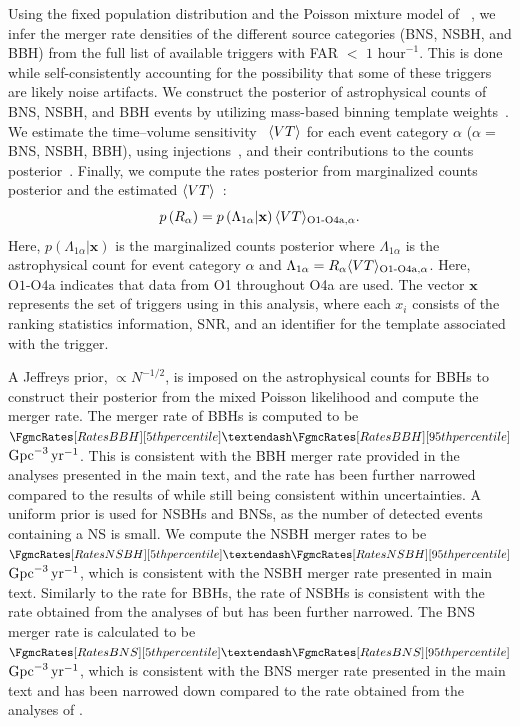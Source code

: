 Using the fixed population distribution and the Poisson mixture model of 
~\cite{Kapadia:2019uut}, we  infer the merger rate densities of the different 
source categories (\ac{BNS}, \ac{NSBH}, and \ac{BBH}) from the full list of 
available \GSTLAL triggers with \ac{FAR} $<$ $1$ $\text{hour}^{-1}$.
This is done while self-consistently accounting for the 
possibility that some of these triggers are likely noise artifacts. 
We construct the posterior of astrophysical counts of \ac{BNS}, \ac{NSBH}, 
and \ac{BBH} events by utilizing mass-based binning template weights~\citep{Ray:2023nhx}.
We estimate the time--volume sensitivity~\citep{Tiwari:2017ndi, GWTC:Methods} 
$\langle VT \rangle$ for each event category $\alpha$ 
($\alpha = $ \ac{BNS}, \ac{NSBH}, \ac{BBH}), using injections~\citep{Essick:2025zed}, 
and their contributions to the counts posterior~\citep{Kapadia:2019uut}. 
Finally, we compute the rates posterior from marginalized counts posterior and 
the estimated $\langle VT \rangle$~\citep{LIGOScientific:2018mvr, LIGOScientific:2020kqk, KAGRA:2021duu, GWTC:Results}:
\begin{equation}
	p\left(R_\alpha\right) = p\left(\Lambda_{1 \alpha} | \mathbf{x} \right) \langle VT \rangle_{\text{O1-O4a}, \alpha} .
	\label{eq:fgmc}
\end{equation}
Here, $p\left(\Lambda_{1 \alpha} | \mathbf{x} \right)$ is the marginalized counts 
posterior where $\Lambda_{1 \alpha}$ is the astrophysical count for event 
category $\alpha$ and 
$\Lambda_{1 \alpha} = R_\alpha \langle VT \rangle_{\text{O1-O4a}, \alpha}$.
Here, $\text{O1-O4a}$ indicates that data from \ac{O1} throughout \ac{O4a} are used. 
The vector $\mathbf{x}$ represents the set of triggers using in this analysis, 
where each $x_i$ consists of the ranking statistics information, \ac{SNR}, and 
an identifier for the template associated with the trigger.

A Jeffreys prior, $\propto N^{-1/2}$, is imposed on the astrophysical counts 
for \acp{BBH} to construct their posterior from the mixed Poisson likelihood 
and compute the merger rate. 
The merger rate of \acp{BBH} is computed to be 
$\CIBoundsDash{\FgmcRates[RatesBBH]}$ $\mathrm{Gpc}^{-3}\,\mathrm{yr}^{-1}$. 
This is consistent with the \ac{BBH} merger 
rate provided in the analyses presented in the main text, and the rate has been 
further narrowed compared to the results of \citet{KAGRA:2021duu} while still 
being consistent within uncertainties.  
A uniform prior is used for \acp{NSBH} and \acp{BNS}, as the number of detected 
events containing a \ac{NS} is small. 
We compute the \ac{NSBH} merger rates to be 
$\CIBoundsDash{\FgmcRates[RatesNSBH]}$ $\mathrm{Gpc}^{-3}\,\mathrm{yr}^{-1}$, 
which is consistent with the \ac{NSBH} merger rate presented in main text. 
Similarly to the rate for \acp{BBH}, the rate of \acp{NSBH} is consistent with 
the rate obtained from the analyses of \gwtcthree but has been further narrowed.
The \ac{BNS} merger rate is calculated to be 
$\CIBoundsDash{\FgmcRates[RatesBNS]}$ $\mathrm{Gpc}^{-3}\,\mathrm{yr}^{-1}$, 
which is consistent with the \ac{BNS} merger rate presented in the main text and 
has been narrowed down compared to the rate obtained from the analyses of 
\gwtcthree.


